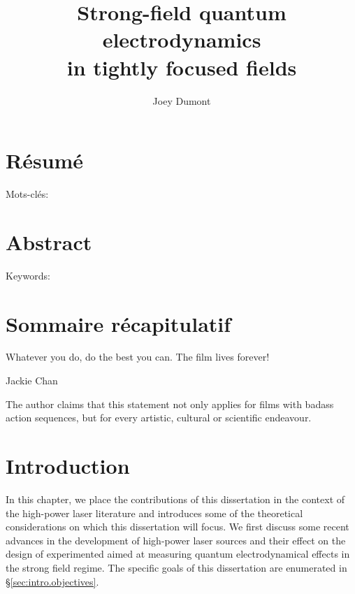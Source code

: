 \documentclass[11pt,SymmetricalJury]{inrsthesis/inrsthesis}
\title{Strong-field quantum electrodynamics \\ in tightly focused fields}
\author{Joey Dumont}
\begin{document}
\frontmatter

\maketitle

\chapter{Résumé}

Mots-clés:

\chapter{Abstract}

Keywords:

\chapter{Sommaire récapitulatif}
\cleardoublepage

\tableofcontents
\cleardoublepage

\listoftables
\cleardoublepage

\listoffigures
\cleardoublepage

\dedication{To my wife and son.}
\cleardoublepage

\epigraph{Whatever you do, do the best you can. The film lives forever!}{Jackie Chan}

\begin{flushright}
\begin{minipage}{0.35\textwidth}
The author claims that this statement not only applies for films with badass
action sequences, but for every artistic, cultural or scientific endeavour.
\end{minipage}
\end{flushright}

\cleardoublepage

\mainmatter

\chapter{Introduction}

In this chapter, we place the contributions of this dissertation in the context
of the high-power laser literature and introduces some of the theoretical
considerations on which this dissertation will focus. We first discuss some recent
advances in the development of high-power laser sources and their effect
on the design of experimented aimed at measuring quantum electrodynamical
effects in the strong field regime. The specific goals of this dissertation are
enumerated in \S\ref{sec:intro.objectives}.
\end{document}
